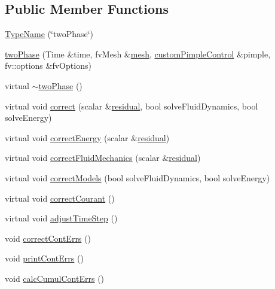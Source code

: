 \subsection*{Public Member Functions}
\begin{DoxyCompactItemize}
\item 
\hyperlink{classFoam_1_1thermalHydraulicsModels_1_1twoPhase_acad575be111b7e498bf9554089dbf460}{Type\+Name} (\char`\"{}two\+Phase\char`\"{})
\item 
\hyperlink{classFoam_1_1thermalHydraulicsModels_1_1twoPhase_aea7dc011974d023076cc9a39206e7179}{two\+Phase} (Time \&time, fv\+Mesh \&\hyperlink{createMeshesPostProcess_8H_a8bb1e58291d2d2b653e024a4f4bffe38}{mesh}, \hyperlink{classFoam_1_1customPimpleControl}{custom\+Pimple\+Control} \&pimple, fv\+::options \&fv\+Options)
\item 
virtual \hyperlink{classFoam_1_1thermalHydraulicsModels_1_1twoPhase_a022b221e9a7e72aadcdf4b97411a8d1b}{$\sim$two\+Phase} ()
\item 
virtual void \hyperlink{classFoam_1_1thermalHydraulicsModels_1_1twoPhase_ace6b3314b058f5c94eb96f99a1f4784d}{correct} (scalar \&\hyperlink{solveThermalMechanics_8H_a840cf6bbf9aacf15bd364b478394c3a7}{residual}, bool solve\+Fluid\+Dynamics, bool solve\+Energy)
\item 
virtual void \hyperlink{classFoam_1_1thermalHydraulicsModels_1_1twoPhase_ad7a94cfeb7bfe17f10cb2a3782e1e896}{correct\+Energy} (scalar \&\hyperlink{solveThermalMechanics_8H_a840cf6bbf9aacf15bd364b478394c3a7}{residual})
\item 
virtual void \hyperlink{classFoam_1_1thermalHydraulicsModels_1_1twoPhase_adfb5aa92b87e35ceaf380442a10e1094}{correct\+Fluid\+Mechanics} (scalar \&\hyperlink{solveThermalMechanics_8H_a840cf6bbf9aacf15bd364b478394c3a7}{residual})
\item 
virtual void \hyperlink{classFoam_1_1thermalHydraulicsModels_1_1twoPhase_ab339c59ef518e68e6ba82997b9d06454}{correct\+Models} (bool solve\+Fluid\+Dynamics, bool solve\+Energy)
\item 
virtual void \hyperlink{classFoam_1_1thermalHydraulicsModels_1_1twoPhase_a9e1998999bc6cfc318ce37ca9499742e}{correct\+Courant} ()
\item 
virtual void \hyperlink{classFoam_1_1thermalHydraulicsModels_1_1twoPhase_afa22550c6cc24ef09c5cfa31438da8f1}{adjust\+Time\+Step} ()
\item 
void \hyperlink{classFoam_1_1thermalHydraulicsModels_1_1twoPhase_a5a4d8cc3da215d278b0539647e590bd7}{correct\+Cont\+Errs} ()
\item 
void \hyperlink{classFoam_1_1thermalHydraulicsModels_1_1twoPhase_ab40cd21b831676f72b5fbbcc2c0c62cb}{print\+Cont\+Errs} ()
\item 
void \hyperlink{classFoam_1_1thermalHydraulicsModels_1_1twoPhase_a77adf862c35ad1bbeb7fb94b6f78aee6}{calc\+Cumul\+Cont\+Errs} ()
\end{DoxyCompactItemize}

